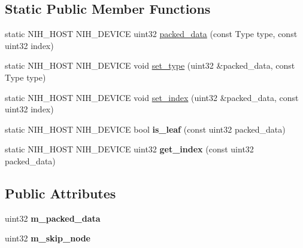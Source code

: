 \subsection*{\-Static \-Public \-Member \-Functions}
\begin{DoxyCompactItemize}
\item 
static \-N\-I\-H\-\_\-\-H\-O\-S\-T \-N\-I\-H\-\_\-\-D\-E\-V\-I\-C\-E uint32 \hyperlink{structnih_1_1_bvh__node_ac2b934af5e1eaf6ede62cdfbe787dd92}{packed\-\_\-data} (const \-Type type, const uint32 index)
\item 
static \-N\-I\-H\-\_\-\-H\-O\-S\-T \-N\-I\-H\-\_\-\-D\-E\-V\-I\-C\-E void \hyperlink{structnih_1_1_bvh__node_a441932bfafb05c24dd7feaa01dde6eb9}{set\-\_\-type} (uint32 \&packed\-\_\-data, const \-Type type)
\item 
static \-N\-I\-H\-\_\-\-H\-O\-S\-T \-N\-I\-H\-\_\-\-D\-E\-V\-I\-C\-E void \hyperlink{structnih_1_1_bvh__node_abd1eb29c4623fc3de7879dc0eb5695c5}{set\-\_\-index} (uint32 \&packed\-\_\-data, const uint32 index)
\item 
\hypertarget{structnih_1_1_bvh__node_a42e670ea779959874780e3220a402214}{
static \-N\-I\-H\-\_\-\-H\-O\-S\-T \-N\-I\-H\-\_\-\-D\-E\-V\-I\-C\-E bool {\bfseries is\-\_\-leaf} (const uint32 packed\-\_\-data)}
\label{structnih_1_1_bvh__node_a42e670ea779959874780e3220a402214}

\item 
\hypertarget{structnih_1_1_bvh__node_accffa20e50a6076ceca639b7ad901218}{
static \-N\-I\-H\-\_\-\-H\-O\-S\-T \-N\-I\-H\-\_\-\-D\-E\-V\-I\-C\-E uint32 {\bfseries get\-\_\-index} (const uint32 packed\-\_\-data)}
\label{structnih_1_1_bvh__node_accffa20e50a6076ceca639b7ad901218}

\end{DoxyCompactItemize}
\subsection*{\-Public \-Attributes}
\begin{DoxyCompactItemize}
\item 
\hypertarget{structnih_1_1_bvh__node_aa6c1e279b4d20f76d4bc511e7a52e6d5}{
uint32 {\bfseries m\-\_\-packed\-\_\-data}}
\label{structnih_1_1_bvh__node_aa6c1e279b4d20f76d4bc511e7a52e6d5}

\item 
\hypertarget{structnih_1_1_bvh__node_a2404bbfd713c958c6e20b282786bf999}{
uint32 {\bfseries m\-\_\-skip\-\_\-node}}
\label{structnih_1_1_bvh__node_a2404bbfd713c958c6e20b282786bf999}

\end{DoxyCompactItemize}

